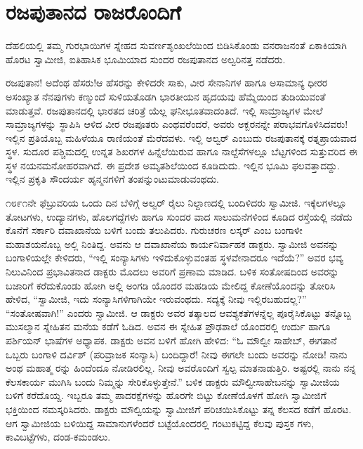 
\chapter{ರಜಪುತಾನದ ರಾಜರೊಂದಿಗೆ}

\noindent

ದೆಹಲಿಯಲ್ಲಿ ತಮ್ಮ ಗುರಭಾಯಿಗಳ ಸ್ನೇಹದ ಸುವರ್ಣಶೃಂಖಲೆಯಿಂದ ಬಿಡಿಸಿಕೊಂಡು ವನರಾಜನಂತೆ ಏಕಾಕಿಯಾಗಿ ಹೊರಟ ಸ್ವಾಮೀಜಿ, ಐತಿಹಾಸಿಕ ಭೂಮಿಯಾದ ಸುಂದರ ರಜಪುತಾನದ ಅಲ್ವರಿನತ್ತ ನಡೆದರು.

ರಜಪುತಾನ! ಅದೆಂಥ ಹೆಸರು!ಆ ಹೆಸರನ್ನು ಕೇಳಿದರೇ ಸಾಕು, ವೀರ ಸೇನಾನಿಗಳ ಹಾಗೂ ಅಸಾಮಾನ್ಯ ಧೀರರ ಅಸಂಖ್ಯಾತ ನೆನಪುಗಳು ಕಣ್ಮುಂದೆ ಸುಳಿಯತೊಡಗಿ ಭಾರತೀಯನ ಹೃದಯವು ಹೆಮ್ಮೆಯಿಂದ ತುಡಿಯುವಂತೆ ಮಾಡುತ್ತವೆ. ರಜಪುತಾನದಲ್ಲಿ ಭಾರತದ ಚರಿತ್ರೆ ಯೆಲ್ಲ ಘನೀಭೂತವಾದಂತಿದೆ. ಇಲ್ಲಿ ಸಾಮ್ರಾಜ್ಯಗಳ ಮೇಲೆ ಸಾಮ್ರಾಜ್ಯಗಳನ್ನು ಸ್ಥಾಪಿಸಿ ಆಳಿದ ವೀರ ರಜಪೂತರು ಎಂಥವರೆಂದರೆ, ಅವರು ಅಕ್ಬರನನ್ನೇ ಪರಾಭವಗೊಳಿಸಿದವರು! ಇಲ್ಲಿನ ಪ್ರತಿಯೊಬ್ಬ ಮಹಿಳೆಯೂ ರಾಣಿಯಂತೆ ಮೆರೆದವಳು. ಇಲ್ಲಿ ಅಲ್ವರ್ ಎಂಬುದು ರಜಪುತಾನಕ್ಕೆ ರತ್ನಪ್ರಾಯವಾದ ಸ್ಥಳ. ಸುದೂರ ಪಶ್ಚಿಮದಲ್ಲಿ ಉನ್ನತ ಶಿಖರಗಳ ಹಿನ್ನೆಲೆಯಿರುವ ಹಾಗೂ ನಾಲ್ದೆಸೆಗಳಲ್ಲೂ ಬೆಟ್ಟಗಳಿಂದ ಸುತ್ತುವರಿದ ಈ ಸ್ಥಳ ನಯನಮನೋಹರವಾಗಿದೆ. ಈ ಪ್ರದೇಶ ಅಮೃತಶಿಲೆಯಿಂದ ಕೂಡಿದುದು. ಇಲ್ಲಿನ ಭೂಮಿ ಫಲವತ್ತಾದದ್ದು. ಇಲ್ಲಿನ ಪ್ರಕೃತಿ ಸೌಂದರ್ಯ ಹೃನ್ಮನಗಳಿಗೆ ತಂಪನ್ನುಂಟುಮಾಡುವಂಥದು.

೧೮೯೧ನೇ ಫೆಬ್ರುವರಿಯ ಒಂದು ದಿನ ಬೆಳಿಗ್ಗೆ ಅಲ್ವರ್ ರೈಲು ನಿಲ್ದಾಣದಲ್ಲಿ ಬಂದಿಳಿದರು ಸ್ವಾಮೀಜಿ. ಇಕ್ಕೆಲಗಳಲ್ಲೂ ತೋಟಗಳು, ಉದ್ಯಾನಗಳು, ಹೊಲಗದ್ದೆಗಳು ಹಾಗೂ ಸುಂದರ ವಾದ ಸಾಲುಮನೆಗಳಿಂದ ಕೂಡಿದ ರಸ್ತೆಯಲ್ಲಿ ನಡೆದು ಕೊನೆಗೆ ಸರ್ಕಾರಿ ದವಾಖಾನೆಯ ಬಳಿಗೆ ಬಂದು ತಲುಪಿದರು. ಗುರುಚರಣ ಲಸ್ಕರ್ ಎಂಬ ಬಂಗಾಳೀ ಮಹಾಶಯನೊಬ್ಬ ಅಲ್ಲಿ ನಿಂತಿದ್ದ. ಅವನು ಆ ದವಾಖಾನೆಯ ಕಾರ್ಯನಿರ್ವಾಹಕ ಡಾಕ್ಟರು. ಸ್ವಾಮೀಜಿ ಅವನನ್ನು ಬಂಗಾಳಿಯಲ್ಲೇ ಕೇಳಿದರು, “ಇಲ್ಲಿ ಸಂನ್ಯಾಸಿಗಳು ಇಳಿದುಕೊಳ್ಳುವಂತಹ ಸ್ಥಳವೇನಾದರೂ ಇದೆಯೆ?” ಅವರ ಭವ್ಯ ನಿಲುವಿನಿಂದ ಪ್ರಭಾವಿತನಾದ ಡಾಕ್ಟರು ಮೊದಲು ಅವರಿಗೆ ಪ್ರಣಾಮ ಮಾಡಿದ. ಬಳಿಕ ಸಂತೋಷದಿಂದ ಅವರನ್ನು ಬಜಾರಿಗೆ ಕರೆದುಕೊಂಡು ಹೋಗಿ ಅಲ್ಲಿ ಅಂಗಡಿ ಯೊಂದರ ಮಹಡಿಯ ಮೇಲಿದ್ದ ಕೋಣೆಯೊಂದನ್ನು ತೋರಿಸಿ ಹೇಳಿದ, “ಸ್ವಾಮೀಜಿ, ಇದು ಸಂನ್ಯಾಸಿಗಳಿಗಾಗಿಯೇ ಇರುವಂಥದು. ಸದ್ಯಕ್ಕೆ ನೀವು ಇಲ್ಲಿರಬಹುದಲ್ಲ?” “ಸಂತೋಷವಾಗಿ!” ಎಂದರು ಸ್ವಾಮೀಜಿ. ಆ ಡಾಕ್ಟರು ಅವರ ತತ್ಕಾಲದ ಆವಶ್ಯಕತೆಗಳನ್ನೆಲ್ಲ ಪೂರೈಸಿಕೊಟ್ಟು ತನ್ನೊಬ್ಬ ಮುಸಲ್ಮಾನ ಸ್ನೇಹಿತನ ಮನೆಯ ಕಡೆಗೆ ಓಡಿದ. ಅವನ ಈ ಸ್ನೇಹಿತ ಪ್ರೌಢಶಾಲೆ ಯೊಂದರಲ್ಲಿ ಉರ್ದು ಹಾಗೂ ಪರ್ಶಿಯನ್ ಭಾಷೆಗಳ ಅಧ್ಯಾಪಕ. ಡಾಕ್ಟರು ಅವನ ಬಳಿಗೆ ಹೋಗಿ ಹೇಳಿದ: “ಓ ಮೌಲ್ವೀ ಸಾಹೇಬ್, ಈಗತಾನೆ ಒಬ್ಬರು ಬಂಗಾಳಿ ದರ್ವಿಶ್ (ಪರಿವ್ರಾಜಕ ಸಂನ್ಯಾಸಿ) ಬಂದಿದ್ದಾರೆ! ನೀವು ಈಗಲೇ ಬಂದು ಅವರನ್ನು ನೋಡಿ! ನಾನು ಅಂಥ ಮಹಾತ್ಮ ರನ್ನು ಹಿಂದೆಂದೂ ನೋಡಿರಲಿಲ್ಲ. ನೀವು ಅವರೊಂದಿಗೆ ಸ್ವಲ್ಪ ಮಾತನಾಡುತ್ತಿರಿ. ಅಷ್ಟರಲ್ಲಿ ನಾನು ನನ್ನ ಕೆಲಸಕಾರ್ಯ ಮುಗಿಸಿ ಬಂದು ನಿಮ್ಮನ್ನು ಸೇರಿಕೊಳ್ಳುತ್ತೇನೆ.” ಬಳಿಕ ಡಾಕ್ಟರು ಮೌಲ್ವೀಸಾಹೇಬನನ್ನು ಸ್ವಾಮೀಜಿಯ ಬಳಿಗೆ ಕರೆದೊಯ್ದ. ಇಬ್ಬರೂ ತಮ್ಮ ಪಾದರಕ್ಷೆಗಳನ್ನು ಹೊರಗೇ ಬಿಟ್ಟು ಕೋಣೆಯೊಳಗೆ ಹೋಗಿ ಸ್ವಾಮೀಜಿಗೆ ಭಕ್ತಿಯಿಂದ ನಮಸ್ಕರಿಸಿದರು. ಡಾಕ್ಟರು ಮೌಲ್ವಿಯನ್ನು ಸ್ವಾಮೀಜಿಗೆ ಪರಿಚಯಿಸಿಕೊಟ್ಟು ತನ್ನ ಕೆಲಸದ ಕಡೆಗೆ ಹೊರಟ. ಆಗ ಸ್ವಾಮೀಜಿಯ ಬಳಿಯಿದ್ದ ಸಾಮಾನುಗಳೆಂದರೆ ಬಟ್ಟೆಯೊಂದರಲ್ಲಿ ಗಂಟುಕಟ್ಟಿದ್ದ ಕೆಲವು ಪುಸ್ತಕ ಗಳು, ಕಾವಿಬಟ್ಟೆಗಳು, ದಂಡ-ಕಮಂಡಲು.

